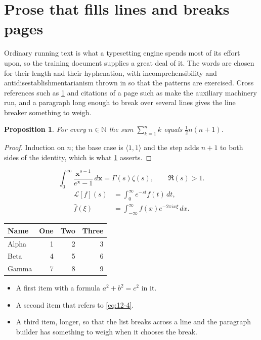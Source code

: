 \documentclass[11pt,a4paper]{report}
\theoremstyle{plain}
\newtheorem{proposition}{Proposition}[chapter]
\newcommand{\vecn}[1]{\mathbf{#1}}
\newcommand{\pairs}[2]{\langle #1,#2\rangle}
\begin{document}
\section{Prose that fills lines and breaks pages}
\label{sec:prose12-4}
Ordinary running text is what a typesetting engine spends most of its effort
upon, so the training document supplies a great deal of it. The words are
chosen for their length and their hyphenation, with incomprehensibility and
antidisestablishmentarianism thrown in so that the patterns are exercised.
Cross references such as \cref{sec:prose12-4} and citations of a page such
as \pageref{sec:prose12-4} make the auxiliary machinery run, and a
paragraph long enough to break over several lines gives the line breaker
something to weigh.
\begin{proposition}\label{prop:12-4}
For every $n\in\mathbb{N}$ the sum $\sum_{k=1}^{n}k$ equals
$\tfrac{1}{2}n(n+1)$.
\end{proposition}
\begin{proof}
Induction on $n$; the base case is $\pairs{1}{1}$ and the step adds $n+1$ to
both sides of the identity, which is what \cref{prop:12-4} asserts.
\end{proof}
\begin{equation}\label{eq:12-4}
  \int_{0}^{\infty}\frac{\vecn{x}^{s-1}}{e^{\vecn{x}}-1}\,d\vecn{x}
    = \Gamma(s)\zeta(s),\qquad \Re(s)>1 .
\end{equation}
\begin{align}
  \mathcal{L}[f](s) &= \int_{0}^{\infty} e^{-st} f(t)\,dt, \\
  \widehat{f}(\xi)  &= \int_{-\infty}^{\infty} f(x) e^{-2\pi i x\xi}\,dx .
\end{align}
\par\noindent\begin{center}
\begin{tabular}{lrrr}
\hline
Name & One & Two & Three \\
\hline
Alpha & 1 & 2 & 3 \\
Beta & 4 & 5 & 6 \\
Gamma & 7 & 8 & 9 \\
\hline
\end{tabular}
\end{center}
\begin{itemize}
  \item A first item with a formula $a^2+b^2=c^2$ in it.
  \item A second item that refers to \eqref{eq:12-4}.
  \item A third item, longer, so that the list breaks across a line and the
    paragraph builder has something to weigh when it chooses the break.
\end{itemize}
\end{document}
